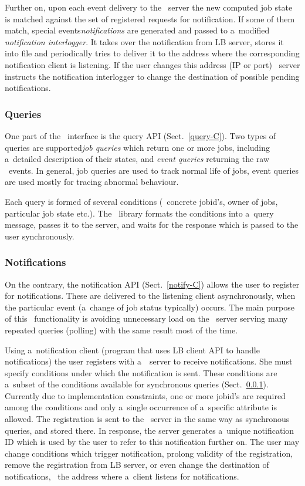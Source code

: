 Further on, upon each event delivery to the \LB\ server the new computed 
job state is matched against the set of registered requests for notification.
If some of them match, special events\Dash\emph{notifications} are generated
and passed to a~modified 
\emph{notification interlogger}.
It takes over the notification from LB server, stores it into file and
periodically tries to deliver it to the address where the corresponding
notification client is listening.
If the user changes this address (IP or port) 
\LB\ server instructs the notification interlogger to change 
the destination of possible pending notifications.

\subsubsection{Queries}
\label{arch-queries}
One part of the \LB\ interface is the query API (Sect.~\ref{query-C}).
Two types of queries are supported\Dash\emph{job queries} which return
one or more jobs, including a~detailed description of their states,
and \emph{event queries} returning the raw \LB\ events.
In general, job queries are used to track normal life of jobs,
event queries are used mostly for tracing abnormal behaviour. 

Each query is formed of several conditions (\eg\ concrete jobid's,
owner of jobs, particular job state etc.).
The \LB\ library formats the conditions into a~query message, passes it to
the server, and waits for the response which is passed to the user
synchronously.

\subsubsection{Notifications}
\label{notification}
On the contrary, the notification API (Sect.~\ref{notify-C}) allows
the user to 
register for notifications. These are delivered to the listening
client asynchronously, when the particular event (a~change of job status
typically) occurs.
The main purpose of this \LB\ functionality is avoiding unnecessary load
on the \LB\ server serving many repeated queries (polling) with the same
result most of the time.

Using a~notification client (program that uses LB client
API to handle notifications) the user registers with a~\LB\ server
to receive notifications. 
She  must specify conditions under which the
notification is sent. These conditions are a~subset of the conditions
available for synchronous queries (Sect.~\ref{arch-queries}).
Currently due to implementation constraints, one
or more jobid's are required among the conditions and only
a~single occurrence of a~specific attribute is allowed. The registration is 
sent to the \LB\ server in the same way as synchronous queries,
and stored there.
In response, the server generates a~unique notification ID which is used
by the user to refer to this notification further on.
The user may
change conditions which trigger notification, prolong validity of
the registration, remove the registration from LB server,
or even change the destination of notifications, \ie\ the address where
a~client listens for notifications.

